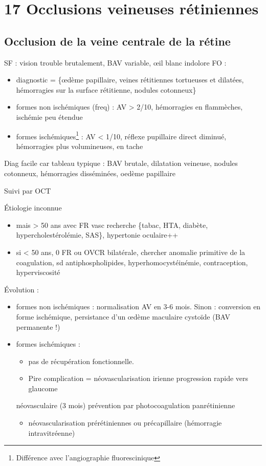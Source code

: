 \documentclass[11pt]{article}
\begin{document}
\section{17 Occlusions veineuses rétiniennes}
\label{sec:org342b90d}
\subsection{Occlusion de la veine centrale de la rétine}
\label{sec:org37023ff}
SF : vision trouble brutalement, BAV variable, \oe{}il blanc indolore
FO : 
\begin{itemize}
\item diagnostic = \{\oe{}dème papillaire, veines rétitiennes tortueuses et dilatées,
hémorragies sur la surface rétitienne, nodules cotonneux\}
\item formes non ischémiques (freq) : AV > 2/10, hémorragies en flammèches, ischémie
peu étendue
\item formes ischémiques\footnote{Différence avec l'angiographie fluorescinique} : AV < 1/10, réflexe pupillaire direct diminué, hémorragies
plus volumineuses, en tache
\end{itemize}

\begin{tcolorbox}
Diag facile car tableau typique : BAV brutale, dilatation veineuse, nodules cotonneux,
hémorragies disséminées, oedème papillaire
\end{tcolorbox}

Suivi par OCT

Étiologie inconnue 
\begin{itemize}
\item mais > 50 ans avec FR vasc \thus recherche \{tabac, HTA, diabète, hypercholestérolémie, SAS\}, hypertonie oculaire++
\item si < 50 ans, 0 FR ou OVCR bilatérale, chercher anomalie primitive de la
coagulation, sd antiphospholipides, hyperhomocystéinémie, contraception, hyperviscosité
\end{itemize}

Évolution :
\begin{itemize}
\item formes non ischémiques : normalisation AV en 3-6 mois. Sinon : conversion en
forme ischémique, persistance d'un \oe{}dème maculaire cystoïde (BAV permanente !)
\item formes ischémiques : 
\begin{itemize}
\item pas de récupération fonctionnelle.
\item Pire complication = néovascularisation irienne \thus progression rapide vers glaucome
\end{itemize}
néovasculaire (3 mois) \thus prévention par photocoagulation panrétinienne
\begin{itemize}
\item néovascularisation prérétiniennes ou précapillaire (hémorragie intravitréenne)
\end{itemize}
\end{itemize}
\end{document}
